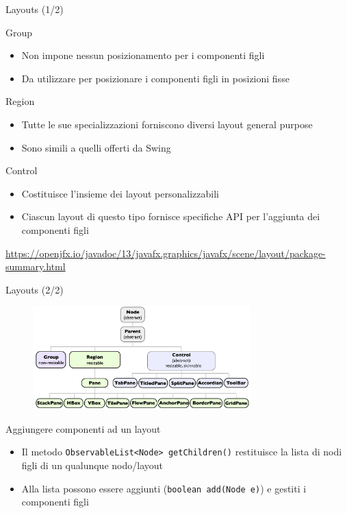 \documentclass[presentation]{beamer}
\begin{document}
\begin{frame}{Layouts (1/2)}
\begin{block}{Group}
\begin{itemize}
\item Non impone nessun posizionamento per i componenti figli
\item Da utilizzare per posizionare i componenti figli in posizioni fisse
\end{itemize}
\end{block}

\begin{block}{Region}
\begin{itemize}
\item Tutte le sue specializzazioni forniscono diversi layout general purpose 
\item Sono simili a quelli offerti da Swing
\end{itemize}
\end{block}

\begin{block}{Control}
\begin{itemize}
\item Costituisce l'insieme dei layout personalizzabili
\item Ciascun layout di questo tipo fornisce specifiche API per l'aggiunta dei componenti figli
\end{itemize}
\end{block}
\url{https://openjfx.io/javadoc/13/javafx.graphics/javafx/scene/layout/package-summary.html}
\end{frame}

\begin{frame}{Layouts (2/2)}
\begin{figure}
\includegraphics[width=0.75\textwidth]{img/layouts.png}
\end{figure}

\begin{block}{Aggiungere componenti ad un layout}
\begin{itemize}
\item Il metodo \texttt{ObservableList<Node> getChildren()} restituisce la lista di nodi figli di un qualunque nodo/layout
\item Alla lista possono essere aggiunti (\texttt{boolean add(Node e)}) e gestiti i componenti figli
\end{itemize}
\end{block}
\end{frame}
\end{document}
